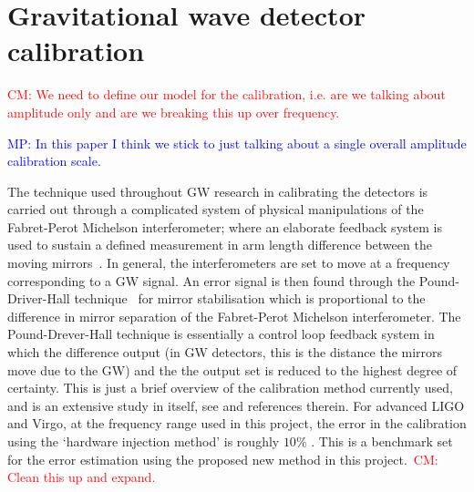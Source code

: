 \documentclass[12pt]{iopart}
\newcommand{\cm}[1]{\textcolor{red}{CM: #1}}
\newcommand{\MP}[1]{\textcolor{blue}{MP: #1}}
\begin{document}
\section{Gravitational wave detector calibration\label{sec:calibration}}

\cm{We need to define our model for the calibration, i.e. are we talking
about amplitude only and are we breaking this up over frequency.}

\MP{In this paper I think we stick to just talking about a single overall amplitude calibration scale.}

The technique used throughout GW research in calibrating the detectors is
carried out through a complicated system of physical manipulations of the
Fabret-Perot Michelson interferometer; where an elaborate feedback system is
used to sustain a defined measurement in arm length difference between the
moving mirrors~\cite{LIGOCal}. In general, the interferometers are set to move
at a frequency corresponding to a GW signal. An error signal is then found
through the Pound-Driver-Hall technique~\cite{Black} for mirror stabilisation
which is proportional to the difference in mirror separation of the
Fabret-Perot Michelson interferometer. The Pound-Drever-Hall technique is
essentially a control loop feedback system in which the difference output (in
GW detectors, this is the distance the mirrors move due to the GW) and the the
output set is reduced to the highest degree of certainty. This is just a brief
overview of the calibration method currently used, and is an extensive study in
itself, see \cite{Vitale:2012} and references therein. For advanced LIGO and Virgo,
at the frequency range used in this project, the error in the calibration using
the `hardware injection method' is roughly $10\%$ \cite{Vitale:2012}. This is a
benchmark set for the error estimation using the proposed new method in this
project.~\cm{Clean this up and expand.}
\end{document}

